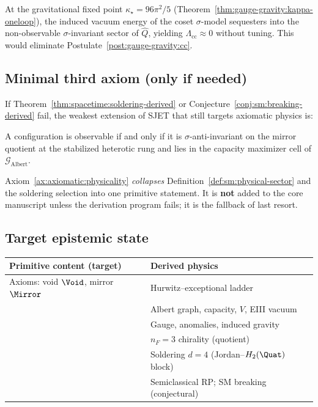 \begin{conjecture}
\label{conj:gauge-gravity:cc-sequester}
At the gravitational fixed point $\kappa_\star=96\pi^2/5$
(Theorem~\ref{thm:gauge-gravity:kappa-oneloop}), the induced vacuum energy of
the coset $\sigma$-model sequesters into the non-observable $\sigma$-invariant
sector of $\hat Q$, yielding $\Lambda_{\mathrm{cc}}\approx0$ without tuning.
This would eliminate Postulate~\ref{post:gauge-gravity:cc}.
\end{conjecture}

\subsection{Minimal third axiom (only if needed)}
\label{sec:axiomatic:axiom3}

If Theorem~\ref{thm:spacetime:soldering-derived} or
Conjecture~\ref{conj:sm:breaking-derived} fail, the weakest extension of SJET
that still targets axiomatic physics is:

\begin{axiom}
\label{ax:axiomatic:physicality}
A configuration is observable if and only if it is $\sigma$-anti-invariant on
the mirror quotient at the stabilized heterotic rung and lies in the capacity
maximizer cell of $\mathcal{G}_{\mathrm{Albert}}$.
\end{axiom}

Axiom~\ref{ax:axiomatic:physicality} \emph{collapses} Definition~\ref{def:sm:physical-sector}
and the soldering selection into one primitive statement. It is \textbf{not}
added to the core manuscript unless the derivation program fails; it is the
fallback of last resort.

\subsection{Target epistemic state}
\label{sec:axiomatic:target}

\begin{center}
\small
\begin{tabular}{@{}ll@{}}
\toprule
\textbf{Primitive content (target)} & \textbf{Derived physics} \\
\midrule
Axioms: void $\Void$, mirror $\Mirror$ & Hurwitz--exceptional ladder \\
 & Albert graph, capacity, $V$, EIII vacuum \\
 & Gauge, anomalies, induced gravity \\
 & $n_F=3$ chirality (quotient) \\
 & Soldering $d=4$ (Jordan--$H_2(\Quat)$ block) \\
 & Semiclassical RP; SM breaking (conjectural) \\
\bottomrule
\end{tabular}
\end{center}

